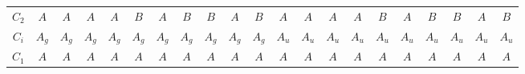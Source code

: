 \documentclass[fleqn,10pt,landscape]{jsarticle}
\begin{document}
\begin{table}[ht!]
\begin{center}
\begin{tabular}{ccccccccccccccccccccc}
$ C_{2} $ & $ A $ & $ A $ & $ A $ & $ A $ & $ B $ & $ A $ & $ B $ & $ B $ & $ A $ & $ B $ & $ A $ & $ A $ & $ A $ & $ A $ & $ B $ & $ A $ & $ B $ & $ B $ & $ A $ & $ B $ \\
$ C_{i} $ & $ A_{g} $ & $ A_{g} $ & $ A_{g} $ & $ A_{g} $ & $ A_{g} $ & $ A_{g} $ & $ A_{g} $ & $ A_{g} $ & $ A_{g} $ & $ A_{g} $ & $ A_{u} $ & $ A_{u} $ & $ A_{u} $ & $ A_{u} $ & $ A_{u} $ & $ A_{u} $ & $ A_{u} $ & $ A_{u} $ & $ A_{u} $ & $ A_{u} $ \\
$ C_{1} $ & $ A $ & $ A $ & $ A $ & $ A $ & $ A $ & $ A $ & $ A $ & $ A $ & $ A $ & $ A $ & $ A $ & $ A $ & $ A $ & $ A $ & $ A $ & $ A $ & $ A $ & $ A $ & $ A $ & $ A $ \\
 \hline \hline
\end{tabular}
\end{center}
\end{table}
\end{document}
